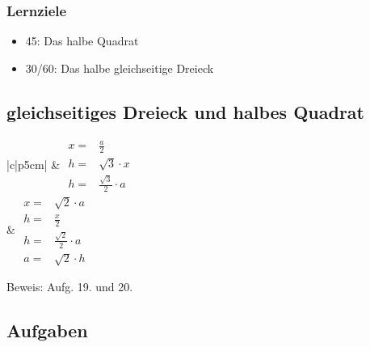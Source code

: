 \subsubsection*{Lernziele}
\begin{itemize}
  \item 45\degre: Das halbe Quadrat
  \item 30\degre/60\degre: Das halbe gleichseitige
  Dreieck
\end{itemize}




\begin{samepage}
\subsection{gleichseitiges Dreieck und halbes Quadrat}

\begin{bbwFillInTabular}{|c|p{5cm}|} 
  \hline
   &
  $\begin{array}{ll}
    x=& \frac{a}{2}                     \\
    h=& \sqrt{3}\cdot{}x                \\
    h=& \frac{\sqrt{3}}{2}\cdot{}a
  \end{array}$ \\

  \hline
   &
  $\begin{array}{ll}
    x=& \sqrt{2}\cdot{}a            \\
    h=& \frac{x}{2}                 \\
    h=& \frac{\sqrt{2}}{2} \cdot{} a\\
    a=& \sqrt{2}\cdot{}h
  \end{array}$ 
  \\
  
  \hline
\end{bbwFillInTabular} 

Beweis: Aufg. 19. und 20. \cite{marthaler20geom}


\end{samepage}

\subsection*{Aufgaben}
\newpage
